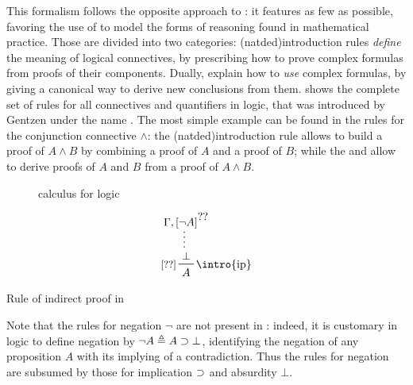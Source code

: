 \AP
This formalism follows the opposite approach to : it
features as few  as possible, favoring the use of \emph{} to model the forms of reasoning found in mathematical practice. Those
are divided into two categories: \intro(natded){introduction rules}
\emph{define} the meaning of logical connectives, by prescribing how to prove
complex formulas from proofs of their components. Dually,  explain how to \emph{use} complex formulas, by giving a canonical way to
derive new conclusions from them.  shows the complete set of
 rules for all connectives and quantifiers in
 logic, that was introduced by Gentzen under the name
\cite{gentzen_untersuchungen_1935}. The most simple example can be found in the
rules for the conjunction connective $\land$: the \kl(natded){introduction rule}
 allows to build a proof of $A \land B$ by combining a proof of $A$
and a proof of $B$; while the   and
 allow to derive proofs of $A$ and $B$ from a proof of $A \land
B$.

\begin{figure*}
  
  \caption{ calculus  for  logic}
\end{figure*}

\begin{marginfigure}
  $$
  \prftree[r][l]{\intro{ip}}{\small[\prfref<H1>]}
  {\summ
    {\Gamma, \prfboundedassumption<H1>{\neg A}}
    {\bot}}
  {A}    
  $$
  \caption{Rule of indirect proof in }
\end{marginfigure}

\begin{remark}
  Note that the rules for negation $\neg$ are not present in
  : indeed, it is customary in  logic to define
  negation by $\neg A \triangleq A \supset \bot$, identifying the negation of any
  proposition $A$ with its implying of a contradiction. Thus the rules for
  negation are subsumed by those for implication $\supset$ and absurdity $\bot$.
\end{remark}

